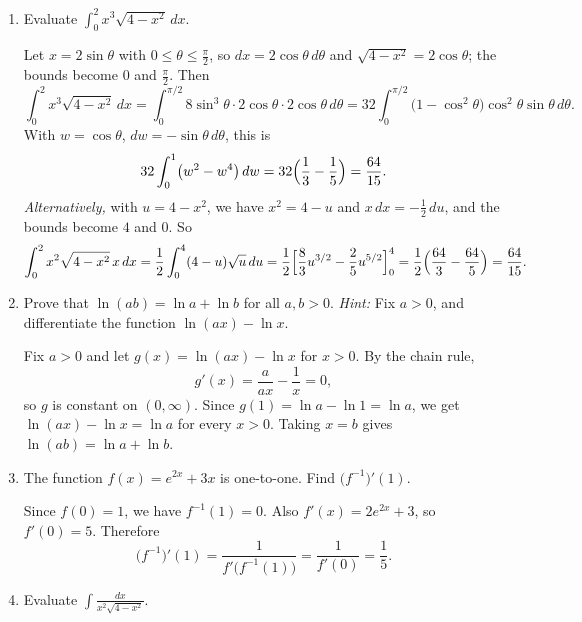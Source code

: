 \documentclass[12pt,letterpaper]{article}
\begin{document}
\begin{enumerate}[label=\textbf{\arabic*.},leftmargin=2em,itemsep=1.25em]
  \item Evaluate $\displaystyle\int_0^2 x^3\sqrt{4-x^2}\,dx$.

    \begin{solution}
      Let $x=2\sin\theta$ with $0\le\theta\le\frac\pi2$, so
      $dx=2\cos\theta\,d\theta$ and $\sqrt{4-x^2}=2\cos\theta$; the bounds
      become $0$ and $\frac\pi2$. Then
      \[
        \int_0^2 x^3\sqrt{4-x^2}\,dx
        =\int_0^{\pi/2}8\sin^3\theta\cdot2\cos\theta\cdot2\cos\theta\,d\theta
        =32\int_0^{\pi/2}\bigl(1-\cos^2\theta\bigr)\cos^2\theta\sin\theta\,d\theta.
      \]
      With $w=\cos\theta$, $dw=-\sin\theta\,d\theta$, this is
      \[
        32\int_0^1\bigl(w^2-w^4\bigr)\,dw=32\Bigl(\frac13-\frac15\Bigr)
        =\frac{64}{15}.
      \]
      \emph{Alternatively,} with $u=4-x^2$, we have $x^2=4-u$ and
      $x\,dx=-\frac12\,du$, and the bounds become $4$ and $0$. So
      \[
        \int_0^2 x^2\sqrt{4-x^2}\,x\,dx
        =\frac12\int_0^4(4-u)\sqrt u\,du
        =\frac12\Bigl[\frac83u^{3/2}-\frac25u^{5/2}\Bigr]_0^4
        =\frac12\Bigl(\frac{64}{3}-\frac{64}{5}\Bigr)=\frac{64}{15}.
      \]
    \end{solution}

  \item Prove that $\ln(ab)=\ln a+\ln b$ for all $a,b>0$. 
  \emph{Hint:} Fix $a>0$, and differentiate the function 
  $\ln(ax)-\ln x$.

    \begin{solution}
      Fix $a>0$ and let $g(x)=\ln(ax)-\ln x$ for $x>0$. By the chain rule,
      \[
        g'(x)=\frac{a}{ax}-\frac1x=0,
      \]
      so $g$ is constant on $(0,\infty)$. Since
      $g(1)=\ln a-\ln 1=\ln a$, we get $\ln(ax)-\ln x=\ln a$ for every
      $x>0$. Taking $x=b$ gives $\ln(ab)=\ln a+\ln b$.
    \end{solution}

  \item The function $f(x)=e^{2x}+3x$ is one-to-one. Find
    $\bigl(f^{-1}\bigr)'(1)$.

    \begin{solution}
      Since $f(0)=1$, we have $f^{-1}(1)=0$. Also $f'(x)=2e^{2x}+3$, so
      $f'(0)=5$. Therefore
      \[
        \bigl(f^{-1}\bigr)'(1)=\frac{1}{f'\bigl(f^{-1}(1)\bigr)}
        =\frac{1}{f'(0)}=\frac15.
      \]
    \end{solution}

  \item Evaluate $\displaystyle\int\frac{dx}{x^2\sqrt{4-x^2}}$.


\end{enumerate}
\end{document}
